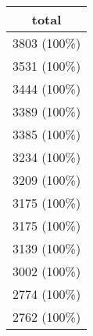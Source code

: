 \documentclass[10pt,]{article}
\begin{document}
\begin{longtable}[c]{@{}c@{}}
\toprule
\begin{minipage}[b]{0.16\columnwidth}\centering\strut
total
\strut\end{minipage}\tabularnewline
\midrule
\endhead
\begin{minipage}[t]{0.16\columnwidth}\centering\strut
3803 (100\%)
\strut\end{minipage}\tabularnewline
\begin{minipage}[t]{0.16\columnwidth}\centering\strut
3531 (100\%)
\strut\end{minipage}\tabularnewline
\begin{minipage}[t]{0.16\columnwidth}\centering\strut
3444 (100\%)
\strut\end{minipage}\tabularnewline
\begin{minipage}[t]{0.16\columnwidth}\centering\strut
3389 (100\%)
\strut\end{minipage}\tabularnewline
\begin{minipage}[t]{0.16\columnwidth}\centering\strut
3385 (100\%)
\strut\end{minipage}\tabularnewline
\begin{minipage}[t]{0.16\columnwidth}\centering\strut
3234 (100\%)
\strut\end{minipage}\tabularnewline
\begin{minipage}[t]{0.16\columnwidth}\centering\strut
3209 (100\%)
\strut\end{minipage}\tabularnewline
\begin{minipage}[t]{0.16\columnwidth}\centering\strut
3175 (100\%)
\strut\end{minipage}\tabularnewline
\begin{minipage}[t]{0.16\columnwidth}\centering\strut
3175 (100\%)
\strut\end{minipage}\tabularnewline
\begin{minipage}[t]{0.16\columnwidth}\centering\strut
3139 (100\%)
\strut\end{minipage}\tabularnewline
\begin{minipage}[t]{0.16\columnwidth}\centering\strut
3002 (100\%)
\strut\end{minipage}\tabularnewline
\begin{minipage}[t]{0.16\columnwidth}\centering\strut
2774 (100\%)
\strut\end{minipage}\tabularnewline
\begin{minipage}[t]{0.16\columnwidth}\centering\strut
2762 (100\%)
\strut\end{minipage}\tabularnewline

\end{longtable}
\end{document}
